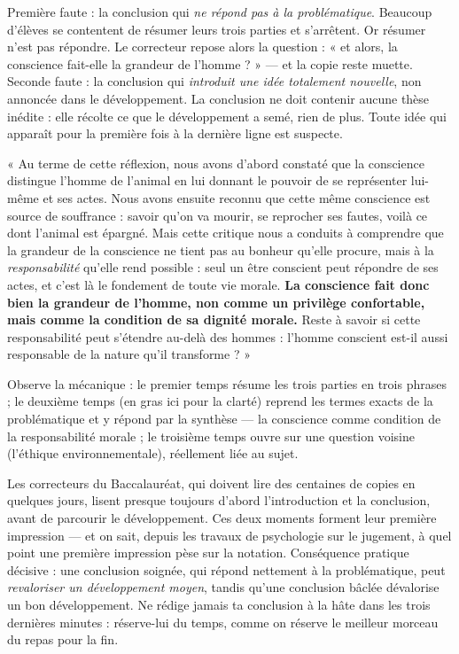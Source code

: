\documentclass[11pt]{article}
\begin{document}
\begin{attention}
Première faute : la conclusion qui \emph{ne répond pas à la problématique}. Beaucoup d'élèves se contentent de résumer leurs trois parties et s'arrêtent. Or résumer n'est pas répondre. Le correcteur repose alors la question : « et alors, la conscience fait-elle la grandeur de l'homme ? » — et la copie reste muette. Seconde faute : la conclusion qui \emph{introduit une idée totalement nouvelle}, non annoncée dans le développement. La conclusion ne doit contenir aucune thèse inédite : elle récolte ce que le développement a semé, rien de plus. Toute idée qui apparaît pour la première fois à la dernière ligne est suspecte.
\end{attention}

\begin{exemplebox}
« Au terme de cette réflexion, nous avons d'abord constaté que la conscience distingue l'homme de l'animal en lui donnant le pouvoir de se représenter lui-même et ses actes. Nous avons ensuite reconnu que cette même conscience est source de souffrance : savoir qu'on va mourir, se reprocher ses fautes, voilà ce dont l'animal est épargné. Mais cette critique nous a conduits à comprendre que la grandeur de la conscience ne tient pas au bonheur qu'elle procure, mais à la \emph{responsabilité} qu'elle rend possible : seul un être conscient peut répondre de ses actes, et c'est là le fondement de toute vie morale. \textbf{La conscience fait donc bien la grandeur de l'homme, non comme un privilège confortable, mais comme la condition de sa dignité morale.} Reste à savoir si cette responsabilité peut s'étendre au-delà des hommes : l'homme conscient est-il aussi responsable de la nature qu'il transforme ? »
\par\smallskip
Observe la mécanique : le premier temps résume les trois parties en trois phrases ; le deuxième temps (en gras ici pour la clarté) reprend les termes exacts de la problématique et y répond par la synthèse — la conscience comme condition de la responsabilité morale ; le troisième temps ouvre sur une question voisine (l'éthique environnementale), réellement liée au sujet.
\end{exemplebox}

\begin{savaistu}
Les correcteurs du Baccalauréat, qui doivent lire des centaines de copies en quelques jours, lisent presque toujours d'abord l'introduction et la conclusion, avant de parcourir le développement. Ces deux moments forment leur première impression — et on sait, depuis les travaux de psychologie sur le jugement, à quel point une première impression pèse sur la notation. Conséquence pratique décisive : une conclusion soignée, qui répond nettement à la problématique, peut \emph{revaloriser un développement moyen}, tandis qu'une conclusion bâclée dévalorise un bon développement. Ne rédige jamais ta conclusion à la hâte dans les trois dernières minutes : réserve-lui du temps, comme on réserve le meilleur morceau du repas pour la fin.
\end{savaistu}
\end{document}
